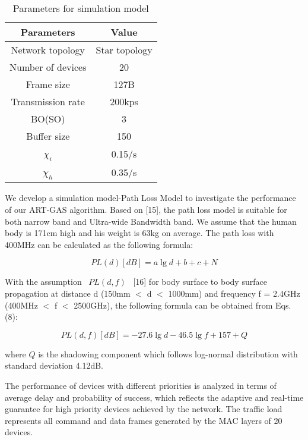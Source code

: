 \documentclass[letterpaper]{sig-alternate-10pt}
\begin{document}
\begin{table}[!t]\setlength{\abovecaptionskip}{0pt}
\setlength{\belowcaptionskip}{5pt}
\renewcommand{\captionfont}{\bfseries}
\centering
\caption{Parameters for simulation model}
\begin{tabular}{|c|c|}\hline Parameters    &   Value    \\
\hline
Network topology&Star topology\\
\cline{1-2}
Number of devices&20\\
\cline{1-2}
Frame size&127B\\
\cline{1-2}
Transmission rate&200kps\\
\cline{1-2}
BO(SO)&3\\
\cline{1-2}
Buffer size&150\\
\cline{1-2}
~${\chi _i}$~&0.15/s\\
\cline{1-2}
~${\chi _h}$~&0.35/s\\
\hline
\end{tabular}
\end{table}

We develop a simulation model-Path Loss Model to investigate the performance of our ART-GAS algorithm. Based on [15], the path loss model is suitable for both narrow band and Ultra-wide Bandwidth band. We assume that the human body is 171cm high and his weight is 63kg on average. The path loss with 400MHz can be calculated as the following formula:

\begin{equation}PL(d)\left[ {dB} \right] = a\lg d + b + c + N\end{equation}

With the assumption ~$PL(d,f)$~ [16] for body surface to body surface propagation at distance d (150mm $<$ d $<$ 1000mm) and frequency f = 2.4GHz (400MHz $<$ f $<$ 2500GHz), the following formula can be obtained from Eqs. (8):

\begin{equation}PL(d,f)\left[ {dB} \right] =  - 27.6\lg d - 46.5\lg f + 157 + Q\end{equation}

where $Q$ is the shadowing component which follows log-normal distribution with standard deviation 4.12dB.

The performance of devices with different priorities is analyzed in terms of average delay and probability of success, which reflects the adaptive and real-time guarantee for high priority devices achieved by the network. The traffic load represents all command and data frames generated by the MAC layers of 20 devices.
\end{document}
